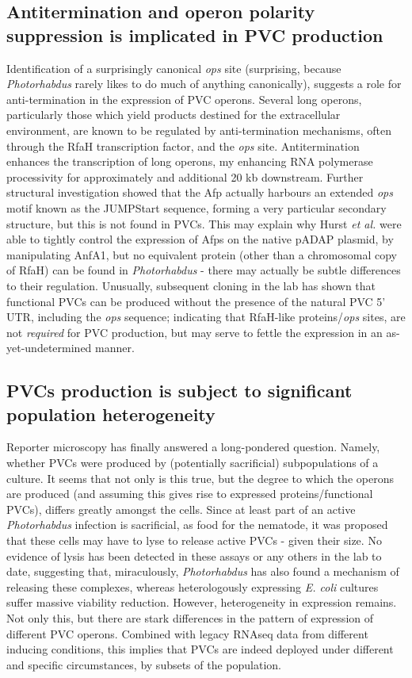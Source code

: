 \subsection{Antitermination and operon polarity suppression is implicated in PVC production}
Identification of a surprisingly canonical \emph{ops} site (surprising, because \emph{Photorhabdus} rarely likes to do much of anything canonically), suggests a role for anti-termination in the expression of PVC operons. Several long operons, particularly those which yield products destined for the extracellular environment, are known to be regulated by anti-termination mechanisms, often through the RfaH transcription factor, and the \emph{ops} site. Antitermination enhances the transcription of long operons, my enhancing RNA polymerase processivity for approximately and additional 20 kb downstream. Further structural investigation showed that the Afp actually harbours an extended \emph{ops} motif known as the JUMPStart sequence, forming a very particular secondary structure, but this is not found in PVCs. This may explain why Hurst \emph{et al.} were able to tightly control the expression of Afps on the native pADAP plasmid, by manipulating AnfA1, but no equivalent protein (other than a chromosomal copy of RfaH) can be found in \emph{Photorhabdus} - there may actually be subtle differences to their regulation. Unusually, subsequent cloning in the lab has shown that functional PVCs can be produced without the presence of the natural PVC 5' UTR, including the \emph{ops} sequence; indicating that RfaH-like proteins/\emph{ops} sites, are not \emph{required} for PVC production, but may serve to fettle the expression in an as-yet-undetermined manner.

\subsection{PVCs production is subject to significant population heterogeneity}
Reporter microscopy has finally answered a long-pondered question. Namely, whether PVCs were produced by (potentially sacrificial) subpopulations of a culture. It seems that not only is this true, but the degree to which the operons are produced (and assuming this gives rise to expressed proteins/functional PVCs), differs greatly amongst the cells. Since at least part of an active \emph{Photorhabdus} infection is sacrificial, as food for the nematode, it was proposed that these cells may have to lyse to release active PVCs - given their size. No evidence of lysis has been detected in these assays or any others in the lab to date, suggesting that, miraculously, \emph{Photorhabdus} has also found a mechanism of releasing these complexes, whereas heterologously expressing \emph{E. coli} cultures suffer massive viability reduction. However, heterogeneity in expression remains. Not only this, but there are stark differences in the pattern of expression of different PVC operons. Combined with legacy RNAseq data from different inducing conditions, this implies that PVCs are indeed deployed under different and specific circumstances, by subsets of the population.




